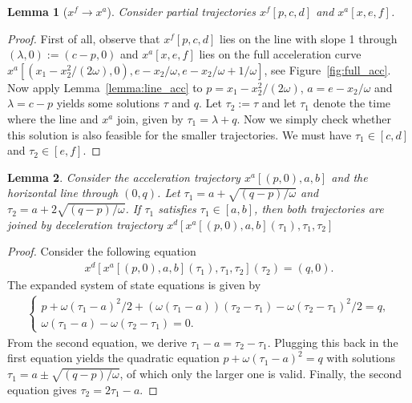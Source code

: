 \documentclass[a4paper]{report}
\theoremstyle{definition}
\theoremstyle{plain}
\newtheorem{lemma}{Lemma}[chapter]
\begin{document}
\begin{lemma}[$x^{f} \rightarrow x^{a}$]
Consider partial trajectories $x^{f}[p, c, d]$ and $x^{a}[x, e, f]$.
\end{lemma}
\begin{proof}
  First of all, observe that $x^{f}[p, c, d]$ lies on the line with slope 1
  through $(\lambda, 0) := (c - p, 0)$ and $x^{a}[x, e, f]$ lies on the full
  acceleration curve
  $x^{a}[(x_{1} - x_{2}^{2}/(2\omega) , 0), e - x_{2}/\omega, e - x_{2}/\omega + 1/\omega]$, see
  Figure~\ref{fig:full_acc}.
  Now apply Lemma~\ref{lemma:line_acc} to $p = x_{1} - x_{2}^{2}/(2\omega)$,
  $a = e - x_{2}/\omega$ and $\lambda = c - p$ yields some solutions $\tau$ and $q$.
  Let $\tau_{2} := \tau$ and let $\tau_{1}$ denote the time where the line and
  $x^{a}$ join, given by $\tau_{1} = \lambda + q$. Now we simply check whether this
  solution is also feasible for the smaller trajectories. We must have
  $\tau_{1} \in [c, d]$ and $\tau_{2} \in [e, f]$.
\end{proof}


\begin{lemma}
  \label{lemma:acc_hline}
  Consider the acceleration trajectory $x^{a}[(p, 0), a, b]$ and the horizontal
  line through $(0, q)$. Let $\tau_{1} = a + \sqrt{(q-p)/\omega}$ and
  $\tau_{2} = a + 2\sqrt{(q-p)/\omega}$. If $\tau_{1}$ satisfies
  $\tau_{1} \in [a, b]$, then both trajectories are joined by deceleration
  trajectory $x^{d}[x^{a}[(p, 0), a, b](\tau_{1}), \tau_{1}, \tau_{2}]$
\end{lemma}
\begin{proof}
  Consider the following equation
  \begin{align*}
    x^{d}[x^{a}[(p, 0),a,b](\tau_{1}), \tau_{1}, \tau_{2}](\tau_{2}) = (q, 0) .
  \end{align*}
  The expanded system of state equations is given by
  \begin{align*}
    \begin{cases}
      p + \omega (\tau_{1} - a)^{2}/2 + (\omega(\tau_{1} - a)) (\tau_{2} - \tau_{1}) - \omega(\tau_{2} - \tau_{1})^{2}/2 = q , \\
      \omega(\tau_{1} - a) - \omega(\tau_{2} - \tau_{1}) = 0 .
    \end{cases}
  \end{align*}
  From the second equation, we derive $\tau_{1} - a = \tau_{2} - \tau_{1}$.
  Plugging this back in the first equation yields the quadratic equation
  $p + \omega(\tau_{1} - a)^{2} = q$ with solutions
  $\tau_{1} = a \pm \sqrt{(q-p)/\omega}$, of which only the larger one is valid.
  Finally, the second equation gives $\tau_{2} = 2\tau_{1} - a$.
\end{proof}
\end{document}
